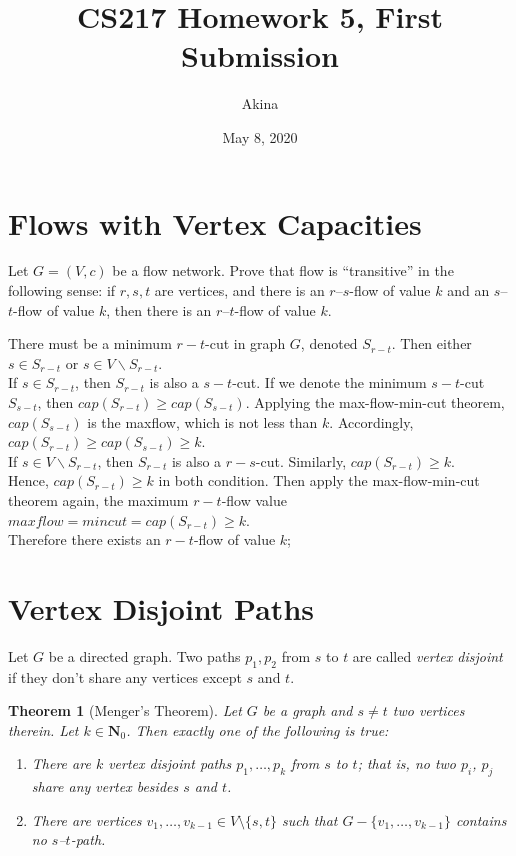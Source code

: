\documentclass[11pt,a4paper,oneside]{article}
\newtheorem{theorem}{Theorem}
\renewcommand{\hwtitle} {CS217 Homework 5, First Submission}
\renewcommand{\hwauthor}{Akina}
\renewcommand{\hwdate}{May 8, 2020}
\begin{document}
\title{\hwtitle}
\author{\hwauthor}
\date{\hwdate}
\maketitle



\setcounter{section}{4}
\section*{Flows with Vertex Capacities}


\begin{problem}{1}
	\statement
    Let $G = (V,c)$ be a flow network. Prove that flow is ``transitive'' in the following sense: if $r,s,t$ are vertices, 
    and there is an $r$--$s$-flow of value $k$ and an $s$--$t$-flow of value $k$, then there is an $r$--$t$-flow of 
    value $k$.
    
    \solution
    There must be a minimum $r-t$-cut in graph $G$, denoted $S_{r-t}$. Then  either $s \in S_{r-t}$ or $s \in V \backslash S_{r-t} $.\\
    If $s \in S_{r-t}$, then $S_{r-t}$ is also a $s - t$-cut. If we denote the minimum $s-t$-cut $S_{s-t}$, then $cap(S_{r-t}) \ge cap(S_{s-t})$. Applying the max-flow-min-cut theorem, $cap(S_{s-t})$ is the maxflow, which is not less than $k$. Accordingly, $cap(S_{r-t}) \ge cap(S_{s-t}) \ge k$.\\
    If $s \in V \backslash S_{r-t}$, then $S_{r-t}$ is also a $r - s$-cut. Similarly, $cap(S_{r-t}) \ge k$.\\
    Hence, $cap(S_{r-t}) \ge k$ in both condition. Then apply the max-flow-min-cut theorem again, the maximum $r - t$-flow value $maxflow = mincut = cap(S_{r - t}) \ge k$.\\
    Therefore there exists an $r-t$-flow of value $k$;
\end{problem}

\section*{Vertex Disjoint Paths}

Let $G$ be a directed graph. Two paths $p_1, p_2$ from $s$ to $t$ are called {\em vertex disjoint}
if they don't share any vertices except $s$ and $t$. 

\begin{theorem}[Menger's Theorem]
   Let $G$ be a graph and $s \ne t$ two vertices therein. Let $k \in \mathbf{N}_0$. 
   Then exactly one of the following is true:
   \begin{enumerate}
   \item There are $k$ vertex disjoint paths $p_1,\dots,p_k$ from $s$ to $t$; that is, no two $p_i$, $p_j$ share
   any vertex besides $s$ and $t$.
   \item There are vertices $v_1,\dots,v_{k-1} \in V \setminus \{s,t\}$ such that
   $G - \{v_1,\dots, v_{k-1}\}$ contains no $s$--$t$-path.
   \end{enumerate}
\end{theorem}
\end{document}
